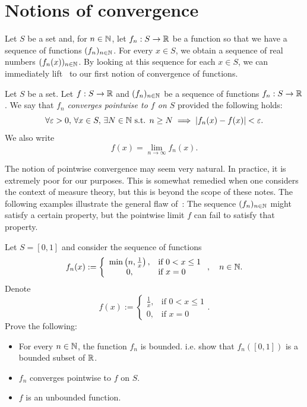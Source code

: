\section{Notions of convergence}
\label{sec:cvg_cts}
Let $S$ be a set and, for $n\in\mathbb{N}$, let $f_n:S \to \mathbb{R}$ be a function so that we have a sequence of functions $(f_n)_{n\in\mathbb{N}}$. For every $x\in S$, we obtain a sequence of real numbers $(f_n(x))_{n\in\mathbb{N}}$. By looking at this sequence for each $x\in S$, we can immediately lift~ to our first notion of convergence of functions.
\begin{defn}
	\label{defn:ptwise}
	Let $S$ be a set. Let $f:S\to \mathbb{R}$ and $(f_n)_{n\in\mathbb{N}}$ be a sequence of functions $f_n:S\to \mathbb{R}$. We say that $f_n$ \textit{converges pointwise to $f$ on $S$} provided the following holds:
	\[
	\forall \varepsilon>0,\,\forall x\in S,\, \exists N\in\mathbb{N}\text{ s.t. }n\ge N \implies |f_n(x) - f(x)|<\varepsilon.
	\]
	We also write
	\[
	f(x) = \lim_{n\to \infty} f_n(x).
	\]
\end{defn}
The notion of pointwise convergence may seem very natural. In practice, it is extremely poor for our purposes. This is somewhat remedied when one considers the context of measure theory, but this is beyond the scope of these notes. The following examples illustrate the general flaw of~: The sequence $(f_n)_{n\in\mathbb{N}}$ might satisfy a certain property, but the pointwise limit $f$ can fail to satisfy that property.
\begin{ex}
	Let $S = [0,1]$ and consider the sequence of functions
	\[
	f_n(x):=\left\{
	\begin{array}{cl}
		\min \left(n,\frac{1}{x}\right), 	&\text{if }0<x\le 1 	\\
		0, 	&\text{if }x=0
	\end{array}
	\right.,\quad n\in\mathbb{N}.
	\]
	Denote
	\[
	f(x) := \left\{
	\begin{array}{cl}
		\frac{1}{x},	&\text{if }0<x\le 1 	\\
		0, 	&\text{if }x=0
	\end{array}
	\right..
	\]
	Prove the following:
	\begin{itemize}
		\item For every $n\in\mathbb{N}$, the function $f_n$ is bounded. i.e. show that $f_n([0,1])$ is a bounded subset of $\mathbb{R}$.
		\item $f_n$ converges pointwise to $f$ on $S$.
		\item $f$ is an unbounded function.
	\end{itemize}
\end{ex}
